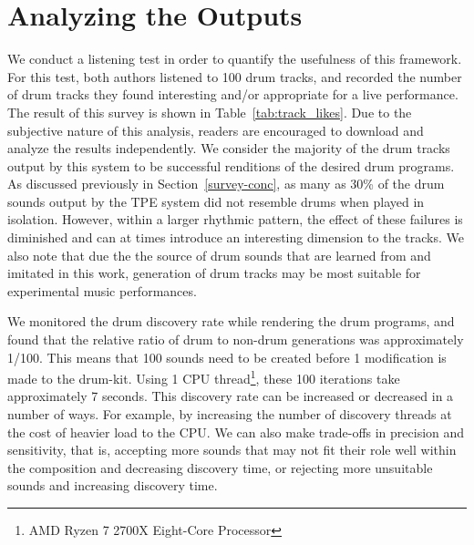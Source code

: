 \documentclass[\main/thesis.tex]{subfiles}
\begin{document}
\section{Analyzing the Outputs}
 We conduct a listening test in order to quantify the usefulness of this framework. For this test, both authors listened to 100 drum tracks, and recorded the number of drum tracks they found interesting and/or appropriate for a live performance. The result of this survey is shown in Table~\ref{tab:track_likes}. Due to the subjective nature of this analysis, readers are encouraged to download and analyze the results independently. We consider the majority of the drum tracks output by this system to be successful renditions of the desired drum programs. As discussed previously in Section~\ref{survey-conc}, as many as 30\% of the drum sounds output by the TPE system did not resemble drums when played in isolation. However, within a larger rhythmic pattern, the effect of these failures is diminished and can at times introduce an interesting dimension to the tracks. We also note that due the the source of drum sounds that are learned from and imitated in this work, generation of drum tracks may be most suitable for experimental music performances.
 
  We monitored the drum discovery rate while rendering the drum programs, and found that the relative ratio of drum to non-drum generations was approximately 1/100. This means that 100 sounds need to be created before 1 modification is made to the drum-kit. Using 1 CPU thread\footnote{AMD Ryzen 7 2700X Eight-Core Processor}, these 100 iterations take approximately 7 seconds. This discovery rate can be increased or decreased in a number of ways. For example, by increasing the number of discovery threads at the cost of heavier load to the CPU. We can also make trade-offs in precision and sensitivity, that is, accepting more sounds that may not fit their role well within the composition and decreasing discovery time, or rejecting more unsuitable sounds and increasing discovery time. 
\begin{table}[tbp]
\caption{\label{tab:track_likes} Measuring the quality of generated drum tracks}
\end{table}
\end{document}
